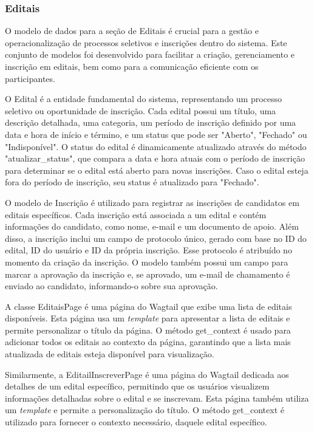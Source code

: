 \subsubsection{Editais}

O modelo de dados para a seção de Editais é crucial para a gestão e operacionalização de processos seletivos e inscrições dentro do sistema. Este conjunto de modelos foi desenvolvido para facilitar a criação, gerenciamento e inscrição em editais, bem como para a comunicação eficiente com os participantes.

O Edital é a entidade fundamental do sistema, representando um processo seletivo ou oportunidade de inscrição. Cada edital possui um título, uma descrição detalhada, uma categoria, um período de inscrição definido por uma data e hora de início e término, e um status que pode ser "Aberto", "Fechado" ou "Indisponível". O status do edital é dinamicamente atualizado através do método "atualizar\_status", que compara a data e hora atuais com o período de inscrição para determinar se o edital está aberto para novas inscrições. Caso o edital esteja fora do período de inscrição, seu status é atualizado para "Fechado".

O modelo de Inscrição é utilizado para registrar as inscrições de candidatos em editais específicos. Cada inscrição está associada a um edital e contém informações do candidato, como nome, e-mail e um documento de apoio. Além disso, a inscrição inclui um campo de protocolo único, gerado com base no ID do edital, ID do usuário e ID da própria inscrição. Esse protocolo é atribuído no momento da criação da inscrição. O modelo também possui um campo para marcar a aprovação da inscrição e, se aprovado, um e-mail de chamamento é enviado ao candidato, informando-o sobre sua aprovação.

A classe EditaisPage é uma página do Wagtail que exibe uma lista de editais disponíveis. Esta página usa um \textit{template} para apresentar a lista de editais e permite personalizar o título da página. O método get\_context é usado para adicionar todos os editais ao contexto da página, garantindo que a lista mais atualizada de editais esteja disponível para visualização.

Similarmente, a EditailInscreverPage é uma página do Wagtail dedicada aos detalhes de um edital específico, permitindo que os usuários visualizem informações detalhadas sobre o edital e se inscrevam. Esta página também utiliza um \textit{template} e permite a personalização do título. O método get\_context é utilizado para fornecer o contexto necessário, daquele edital específico.

